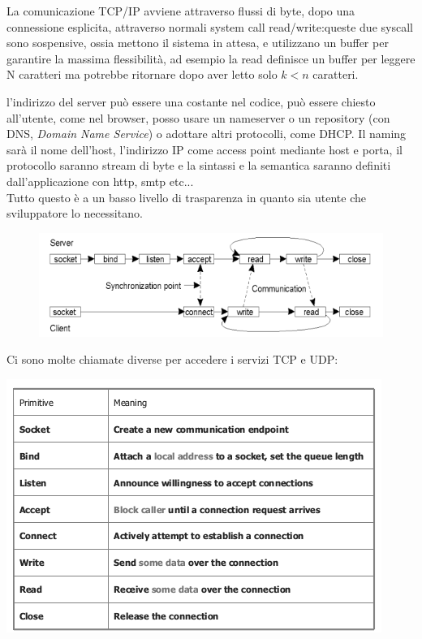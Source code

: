 \documentclass[a4paper,12pt, oneside]{book}
\begin{document}
La comunicazione TCP/IP avviene attraverso flussi di byte, dopo una connessione esplicita, attraverso
normali system call read/write:queste due syscall sono sospensive, ossia mettono il sistema in attesa,
e utilizzano un buffer per garantire la massima flessibilità, ad esempio la read definisce un buffer
per leggere N caratteri ma potrebbe ritornare dopo aver letto solo $k < n$ caratteri.

l'indirizzo del server può essere una costante nel codice, può essere chiesto all'utente, come nel browser, posso usare un nameserver o un repository (con DNS, \textit{Domain Name Service}) o adottare altri protocolli, come DHCP. Il naming sarà il nome dell'host, l'indirizzo IP come access point mediante host e porta, il protocollo saranno stream di byte e la sintassi e la semantica saranno definiti dall'applicazione con http, smtp etc...\\
Tutto questo è a un basso livello di trasparenza in quanto sia utente che sviluppatore lo necessitano.\\
\begin{figure}
\centering
\includegraphics[scale=0.7]{img/sc2.png}
\end{figure}
\newpage
Ci sono molte chiamate diverse per accedere i servizi TCP e UDP:
\begin{center}
\includegraphics[scale=3]{img/sc3.png}
\end{center}
\end{document}
